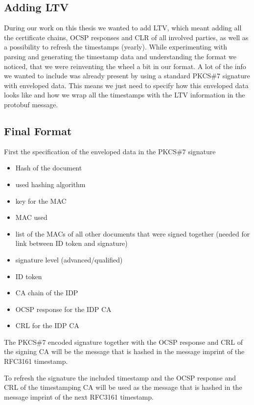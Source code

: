 \subsection{Adding LTV}
During our work on this thesis we wanted to add \gls{LTV}, which meant adding all the certificate chains, \gls{OCSP} responses and \gls{CLR} of all involved parties, as well as a possibility to refresh the timestamps (yearly).
While experimenting with parsing and generating the timestamp data and understanding the format we noticed, that we were reinventing the wheel a bit in our format. A lot of the info we wanted to include was already present by using a standard \gls{PKCS}\#7 signature with enveloped data.
This means we just need to specify how this enveloped data looks like and how we wrap all the timestamps with the \gls{LTV} information in the protobuf message.

\subsection{Final Format}

First the specification of the enveloped data in the \gls{PKCS}\#7 signature

\begin{itemize}
    \item Hash of the document
    \item used hashing algorithm
    \item key for the \gls{MAC}
    \item \gls{MAC} used
    \item list of the \gls{MAC}s of all other documents that were signed together (needed for link between ID token and signature)
    \item signature level (advanced/qualified)
    \item ID token
    \item \gls{CA} chain of the \gls{IDP}
    \item \gls{OCSP} response for the \gls{IDP} \gls{CA}
    \item \gls{CRL} for the \gls{IDP} \gls{CA}
\end{itemize}

The \gls{PKCS}\#7 encoded signature together with the \gls{OCSP} response and \gls{CRL} of the signing \gls{CA} will be the message that is hashed in the message imprint of the \gls{RFC}3161 timestamp.

To refresh the signature the included timestamp and the \gls{OCSP} response and \gls{CRL} of the timestamping \gls{CA} will be used as the message that is hashed in the message imprint of the next \gls{RFC}3161 timestamp.
